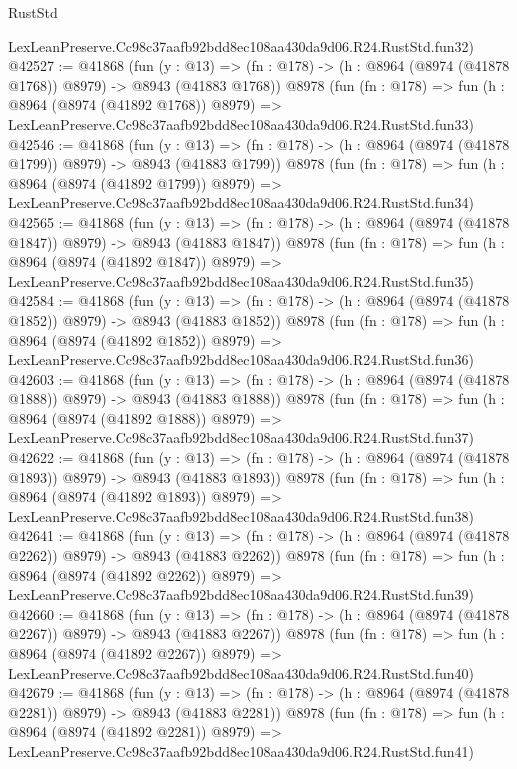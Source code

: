 \begin{lexlean}{RustStd}
\begin{coremodule}
    LexLeanPreserve.Cc98c37aafb92bdd8ec108aa430da9d06.R24.RustStd.fun32)
@42527 := @41868
    (fun (y : @13) =>
    (fn : @178) -> (h : @8964 (@8974 (@41878 @1768)) @8979) -> @8943 (@41883 @1768))
    @8978
    (fun (fn : @178) =>
    fun (h : @8964 (@8974 (@41892 @1768)) @8979) =>
    LexLeanPreserve.Cc98c37aafb92bdd8ec108aa430da9d06.R24.RustStd.fun33)
@42546 := @41868
    (fun (y : @13) =>
    (fn : @178) -> (h : @8964 (@8974 (@41878 @1799)) @8979) -> @8943 (@41883 @1799))
    @8978
    (fun (fn : @178) =>
    fun (h : @8964 (@8974 (@41892 @1799)) @8979) =>
    LexLeanPreserve.Cc98c37aafb92bdd8ec108aa430da9d06.R24.RustStd.fun34)
@42565 := @41868
    (fun (y : @13) =>
    (fn : @178) -> (h : @8964 (@8974 (@41878 @1847)) @8979) -> @8943 (@41883 @1847))
    @8978
    (fun (fn : @178) =>
    fun (h : @8964 (@8974 (@41892 @1847)) @8979) =>
    LexLeanPreserve.Cc98c37aafb92bdd8ec108aa430da9d06.R24.RustStd.fun35)
@42584 := @41868
    (fun (y : @13) =>
    (fn : @178) -> (h : @8964 (@8974 (@41878 @1852)) @8979) -> @8943 (@41883 @1852))
    @8978
    (fun (fn : @178) =>
    fun (h : @8964 (@8974 (@41892 @1852)) @8979) =>
    LexLeanPreserve.Cc98c37aafb92bdd8ec108aa430da9d06.R24.RustStd.fun36)
@42603 := @41868
    (fun (y : @13) =>
    (fn : @178) -> (h : @8964 (@8974 (@41878 @1888)) @8979) -> @8943 (@41883 @1888))
    @8978
    (fun (fn : @178) =>
    fun (h : @8964 (@8974 (@41892 @1888)) @8979) =>
    LexLeanPreserve.Cc98c37aafb92bdd8ec108aa430da9d06.R24.RustStd.fun37)
@42622 := @41868
    (fun (y : @13) =>
    (fn : @178) -> (h : @8964 (@8974 (@41878 @1893)) @8979) -> @8943 (@41883 @1893))
    @8978
    (fun (fn : @178) =>
    fun (h : @8964 (@8974 (@41892 @1893)) @8979) =>
    LexLeanPreserve.Cc98c37aafb92bdd8ec108aa430da9d06.R24.RustStd.fun38)
@42641 := @41868
    (fun (y : @13) =>
    (fn : @178) -> (h : @8964 (@8974 (@41878 @2262)) @8979) -> @8943 (@41883 @2262))
    @8978
    (fun (fn : @178) =>
    fun (h : @8964 (@8974 (@41892 @2262)) @8979) =>
    LexLeanPreserve.Cc98c37aafb92bdd8ec108aa430da9d06.R24.RustStd.fun39)
@42660 := @41868
    (fun (y : @13) =>
    (fn : @178) -> (h : @8964 (@8974 (@41878 @2267)) @8979) -> @8943 (@41883 @2267))
    @8978
    (fun (fn : @178) =>
    fun (h : @8964 (@8974 (@41892 @2267)) @8979) =>
    LexLeanPreserve.Cc98c37aafb92bdd8ec108aa430da9d06.R24.RustStd.fun40)
@42679 := @41868
    (fun (y : @13) =>
    (fn : @178) -> (h : @8964 (@8974 (@41878 @2281)) @8979) -> @8943 (@41883 @2281))
    @8978
    (fun (fn : @178) =>
    fun (h : @8964 (@8974 (@41892 @2281)) @8979) =>
    LexLeanPreserve.Cc98c37aafb92bdd8ec108aa430da9d06.R24.RustStd.fun41)

\end{coremodule}
\end{lexlean}
